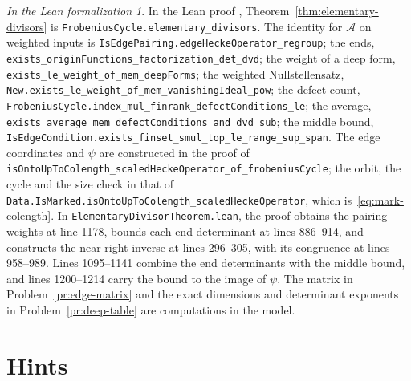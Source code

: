 \documentclass[reqno]{amsart}
\numberwithin{equation}{section}
\theoremstyle{plain}
\theoremstyle{definition}
\theoremstyle{remark}
\newtheorem*{leanremark}{In the Lean formalization}
\newcommand{\Ac}{\mathcal A}
\newcommand{\tl}[1]{\texttt{#1}}
\begin{document}
\begin{leanremark}
\begin{sloppypar}
In the Lean proof \cite{GL}, Theorem~\ref{thm:elementary-divisors} is \tl{FrobeniusCycle.\allowbreak elementary\_\allowbreak divisors}.  The identity for \(\Ac\) on weighted inputs is \tl{IsEdgePairing.\allowbreak edgeHecke\allowbreak Operator\_\allowbreak regroup}; the ends, \tl{exists\_\allowbreak origin\allowbreak Functions\_\allowbreak factorization\_\allowbreak det\_\allowbreak dvd}; the weight of a deep form, \tl{exists\_\allowbreak le\_\allowbreak weight\_\allowbreak of\_\allowbreak mem\_\allowbreak deepForms}; the weighted Nullstellensatz, \tl{New.\allowbreak exists\_\allowbreak le\_\allowbreak weight\_\allowbreak of\_\allowbreak mem\_\allowbreak vanishing\allowbreak Ideal\_\allowbreak pow}; the defect count, \tl{FrobeniusCycle.\allowbreak index\_\allowbreak mul\_\allowbreak fin\allowbreak rank\_\allowbreak defect\allowbreak Conditions\_\allowbreak le}; the average, \tl{exists\_\allowbreak average\_\allowbreak mem\_\allowbreak defect\allowbreak Conditions\_\allowbreak and\_\allowbreak dvd\_\allowbreak sub}; the middle bound, \tl{IsEdge\allowbreak Condition.\allowbreak exists\_\allowbreak finset\_\allowbreak smul\_\allowbreak top\_\allowbreak le\_\allowbreak range\_\allowbreak sup\_\allowbreak span}.  The edge coordinates and \(\psi\) are constructed in the proof of \tl{isOnto\allowbreak UpTo\allowbreak Colength\_\allowbreak scaled\allowbreak Hecke\allowbreak Operator\_\allowbreak of\_\allowbreak frobeniusCycle}; the orbit, the cycle and the size check in that of \tl{Data.\allowbreak IsMarked.\allowbreak isOnto\allowbreak UpTo\allowbreak Colength\_\allowbreak scaled\allowbreak Hecke\allowbreak Operator}, which is~\eqref{eq:mark-colength}.  In \tl{ElementaryDivisorTheorem.lean}, the proof obtains the pairing weights at line 1178, bounds each end determinant at lines 886--914, and constructs the near right inverse at lines 296--305, with its congruence at lines 958--989.  Lines 1095--1141 combine the end determinants with the middle bound, and lines 1200--1214 carry the bound to the image of \(\psi\).  The matrix in Problem~\ref{pr:edge-matrix} and the exact dimensions and determinant exponents in Problem~\ref{pr:deep-table} are computations in the model.
\end{sloppypar}
\end{leanremark}

\section*{Hints}
\end{document}
